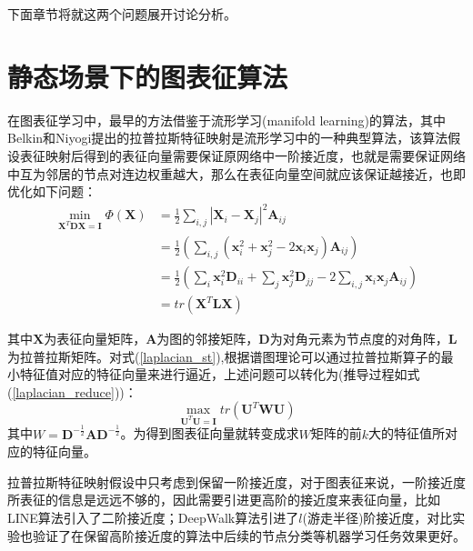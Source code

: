 下面章节将就这两个问题展开讨论分析。


\section{静态场景下的图表征算法}
在图表征学习中，最早的方法借鉴于流形学习(manifold learning)的算法，其中Belkin和Niyogi提出的拉普拉斯特征映射是流形学习中的一种典型算法，该算法假设表征映射后得到的表征向量需要保证原网络中一阶接近度，也就是需要保证网络中互为邻居的节点对连边权重越大，那么在表征向量空间就应该保证越接近，也即优化如下问题：
\begin{equation}\label{laplacian_st}
\begin{aligned}
\min_{\textbf{X}^T\textbf{D}\textbf{X}=\textbf{I}} \Phi(\textbf{X}) &= \frac{1}{2}\sum_{i,j}|\textbf{X}_i - \textbf{X}_j|^2\textbf{A}_{ij} \\
&= \frac{1}{2}(\sum_{i,j}(\textbf{x}_i^2+\textbf{x}_j^2-2\textbf{x}_i\textbf{x}_j) \textbf{A}_{ij}) \\
&=\frac{1}{2} (\sum_i\textbf{x}_i^2\textbf{D}_{ii} +\sum_j \textbf{x}_j^2 \textbf{D}_{jj} - 2\sum_{i,j}\textbf{x}_i \textbf{x}_j \textbf{A}_{ij}) \\
&= tr(\textbf{X}^T\textbf{L}\textbf{X})
\end{aligned}
\end{equation}

其中$\textbf{X}$为表征向量矩阵，$\textbf{A}$为图的邻接矩阵，$\textbf{D}$为对角元素为节点度的对角阵，$\textbf{L}$为拉普拉斯矩阵。对式(\ref{laplacian_st}),根据谱图理论\cite{chung1997spectral}可以通过拉普拉斯算子的最小特征值对应的特征向量来进行逼近，上述问题可以转化为(推导过程如式(\ref{laplacian_reduce}))：
\begin{equation}
\max_{\textbf{U}^T\textbf{U} = \textbf{I}} tr(\textbf{U}^T\textbf{WU})
\end{equation}
其中$W = \textbf{D}^{-\frac{1}{2}}\textbf{AD}^{-\frac{1}{2}} $。为得到图表征向量就转变成求$W$矩阵的前$k$大的特征值所对应的特征向量。

拉普拉斯特征映射假设中只考虑到保留一阶接近度，对于图表征来说，一阶接近度所表征的信息是远远不够的，因此需要引进更高阶的接近度来表征向量，比如LINE算法引入了二阶接近度；DeepWalk算法引进了$l$(游走半径)阶接近度，对比实验也验证了在保留高阶接近度的算法中后续的节点分类等机器学习任务效果更好。

